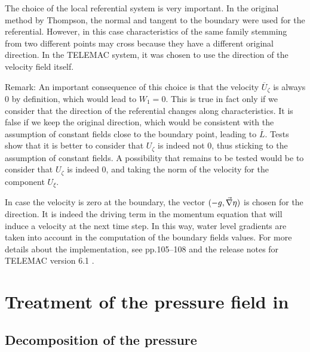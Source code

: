 The choice of the local referential system is very important.
In the original method by Thompson,
the normal and tangent to the boundary were used for the referential.
However, in this case characteristics of the same
family stemming from two different points may cross because they have a
different original direction.
In the TELEMAC system,
it was chosen to use the direction of the velocity field itself.\\
\begin{CommentBlock}{Remark:}
An important consequence of this choice is that the velocity $\overline{U}%
_{\zeta }$ is always 0 by definition, which would lead to $W_{1}=0$. This is
true in fact only if we consider that the direction of the referential
changes along characteristics. It is false if we keep the original direction,
which would be consistent with the assumption of constant fields close to the boundary point,
leading to $\overline{L}$. Tests show that it is better to consider that $%
U_{\zeta }$ is indeed not 0, thus sticking to the assumption of constant fields. A
possibility that remains to be tested would be to consider that $U_{\zeta }$
is indeed 0, and taking the norm of the velocity for the component $U_{\xi }$.
\end{CommentBlock}


In case the velocity is zero at the boundary, the vector $(-g,\vec \nabla\eta)$ is chosen
for the direction. It is indeed the driving term in the momentum equation
that will induce a velocity at the next time step. In this way, water level
gradients are taken into account in the computation of the boundary fields values.
For more details about the implementation, see \cite{hervouet007} pp.105--108
and the release notes for TELEMAC version 6.1 \cite{release61}.

\section{Treatment of the pressure field in }\label{sec:pressureStrategy}

\subsection{Decomposition of the pressure}

